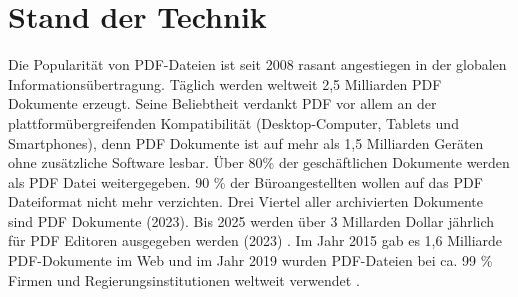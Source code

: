 \chapter{Stand der Technik}
Die Popularität von PDF-Dateien ist seit 2008 rasant angestiegen in der globalen Informationsübertragung. Täglich werden weltweit 2,5 Milliarden PDF Dokumente erzeugt. Seine Beliebtheit verdankt PDF vor allem an der plattformübergreifenden Kompatibilität (Desktop-Computer, Tablets und Smartphones), denn PDF Dokumente ist auf mehr als 1,5 Milliarden Geräten ohne zusätzliche Software lesbar. Über 80\% der geschäftlichen Dokumente werden als PDF Datei weitergegeben. \cite{formilo} 90 \% der Büroangestellten wollen auf das PDF Dateiformat nicht mehr verzichten. Drei Viertel aller archivierten Dokumente sind PDF Dokumente (2023).
Bis 2025 werden über 3 Millarden Dollar jährlich für PDF Editoren ausgegeben werden (2023) \cite{kofax}. Im Jahr 2015 gab es 1,6 Milliarde PDF-Dokumente im Web und im Jahr 2019 wurden PDF-Dateien bei ca. 99 \% Firmen und Regierungsinstitutionen weltweit verwendet \cite{ccc-break-pdf}. 

